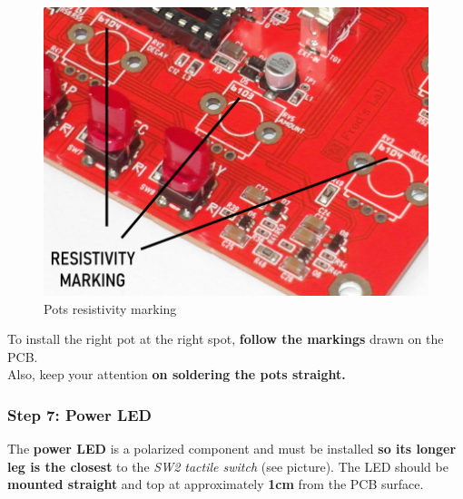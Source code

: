\documentclass{scrartcl}
\begin{document}
\begin{figure}[!ht]
    \begin{center}
        \includegraphics[scale=0.32]{assets/pots-marking.jpg}
        \caption{Pots resistivity marking}
    \end{center}
\end{figure}

To install the right pot at the right spot, \textbf{follow the markings} drawn on the PCB. \\
Also, keep your attention \textbf{on soldering the pots straight.}

\pagebreak

\subsubsection{Step 7: Power LED}

The \textbf{power LED} is a polarized component and must be installed \textbf{so its longer leg is the closest} to the \emph{SW2 tactile switch} (see picture).
The LED should be \textbf{mounted straight} and top at approximately \textbf{1cm} from the PCB surface.
\end{document}
